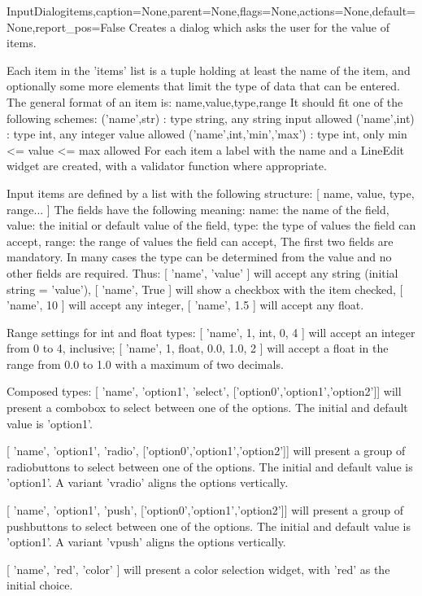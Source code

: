 \begin{classdesc}{InputDialog}{items,caption=None,parent=None,flags=None,actions=None,default=None,report_pos=False}
Creates a dialog which asks the user for the value of items.

        Each item in the 'items' list is a tuple holding at least the name
        of the item, and optionally some more elements that limit the type
        of data that can be entered. The general format of an item is:
          name,value,type,range
        It should fit one of the following schemes:
        ('name',str) : type string, any string input allowed
        ('name',int) : type int, any integer value allowed
        ('name',int,'min','max') : type int, only min <= value <= max allowed
        For each item a label with the name and a LineEdit widget are created,
        with a validator function where appropriate.

        Input items are defined by a list with the following structure:
        [ name, value, type, range... ]
        The fields have the following meaning:
          name:  the name of the field,
          value: the initial or default value of the field,
          type:  the type of values the field can accept,
          range: the range of values the field can accept,
        The first two fields are mandatory. In many cases the type can be
        determined from the value and no other fields are required. Thus:
        [ 'name', 'value' ] will accept any string (initial string = 'value'),
        [ 'name', True ] will show a checkbox with the item checked,
        [ 'name', 10 ] will accept any integer,
        [ 'name', 1.5 ] will accept any float.

        Range settings for int and float types:
        [ 'name', 1, int, 0, 4 ] will accept an integer from 0 to 4, inclusive;
        [ 'name', 1, float, 0.0, 1.0, 2 ] will accept a float in the range
           from 0.0 to 1.0 with a maximum of two decimals.

        Composed types:
        [ 'name', 'option1', 'select', ['option0','option1','option2']] will
        present a combobox to select between one of the options.
        The initial and default value is 'option1'.

        [ 'name', 'option1', 'radio', ['option0','option1','option2']] will
        present a group of radiobuttons to select between one of the options.
        The initial and default value is 'option1'.
        A variant 'vradio' aligns the options vertically. 
        
        [ 'name', 'option1', 'push', ['option0','option1','option2']] will
        present a group of pushbuttons to select between one of the options.
        The initial and default value is 'option1'.
        A variant 'vpush' aligns the options vertically. 

        [ 'name', 'red', 'color' ] will present a color selection widget,
        with 'red' as the initial choice.
        
\end{classdesc}

